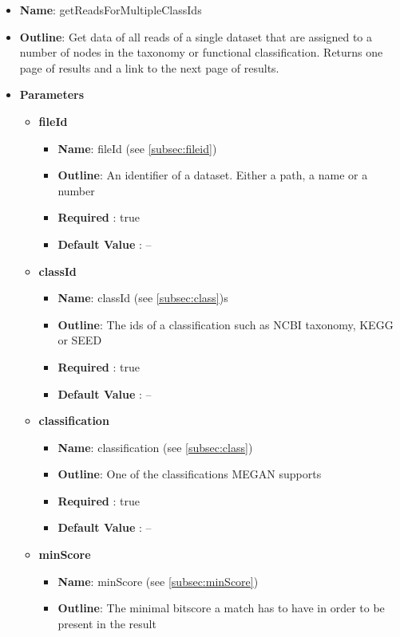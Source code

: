 \documentclass[11pt]{article}
\begin{document}
\begin{itemize}
	\item \textbf{Name}: getReadsForMultipleClassIds
	\item \textbf{Outline}: Get data of all reads of a single dataset that are assigned to a number of nodes in the taxonomy or functional classification. Returns one page of results and a link to the next page of results.
	\item \textbf{Parameters}
		\begin{itemize}
			\item \textbf{fileId}		
				\begin{itemize}
					\item \textbf{Name}: fileId (see \ref{subsec:fileid})
					\item \textbf{Outline}: An identifier of a dataset. Either a path, a name or a number
					\item \textbf{Required} : true
					\item \textbf{Default Value} : --
				\end{itemize}
			\item \textbf{classId}		
				\begin{itemize}
					\item \textbf{Name}: classId (see \ref{subsec:class})s
					\item \textbf{Outline}: The ids of a classification such as NCBI taxonomy, KEGG or SEED
					\item \textbf{Required} : true
					\item \textbf{Default Value} : --
				\end{itemize}
			\item \textbf{classification}		
				\begin{itemize}
					\item \textbf{Name}: classification (see \ref{subsec:class})
					\item \textbf{Outline}: One of the classifications MEGAN supports
					\item \textbf{Required} : true
					\item \textbf{Default Value} : --
				\end{itemize}
			\item \textbf{minScore}		
				\begin{itemize}
					\item \textbf{Name}: minScore (see \ref{subsec:minScore})
					\item \textbf{Outline}: The minimal bitscore a match has to have in order to be present in the result

\end{itemize}
\end{itemize}
\end{itemize}
\end{document}
